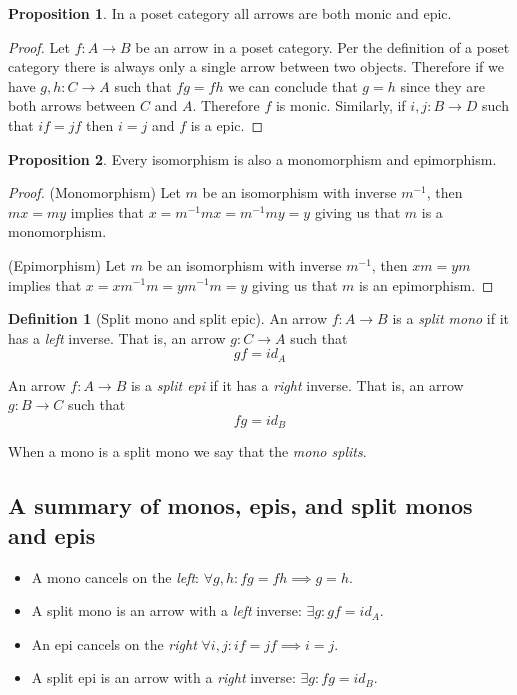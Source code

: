 \documentclass{book}
\theoremstyle{definition}
\newtheorem{definition}{Definition}[section]
\newtheorem{proposition}{Proposition}
\newcommand{\arr}[3]{#1 : #2 \rightarrow #3}
\newcommand\id{\mathit{id}}
\begin{document}
\begin{proposition}
  In a poset category all arrows are both monic and epic.
\end{proposition}
\begin{proof}
  Let $\arr{f}{A}{B}$ be an arrow in a poset category. Per the definition of a
  poset category there is always only a single arrow between two objects.
  Therefore if we have $\arr{g, h}{C}{A}$ such that $fg = fh$ we can conclude
  that $g = h$ since they are both arrows between $C$ and $A$. Therefore $f$ is
  monic. Similarly, if $\arr{i, j}{B}{D}$ such that $if = jf$ then $i = j$ and
  $f$ is a epic.
\end{proof}

\begin{proposition}
  Every isomorphism is also a monomorphism and epimorphism.
\end{proposition}
\begin{proof}
  (Monomorphism) Let $m$ be an isomorphism with inverse $m^{-1}$, then $mx = my$
  implies that $x = m^{-1}mx = m^{-1}my = y$ giving us that $m$ is a
  monomorphism.

  (Epimorphism) Let $m$ be an isomorphism with inverse $m^{-1}$, then $xm = ym$
  implies that $x = xm^{-1}m = ym^{-1}m = y$ giving us that $m$ is an
  epimorphism.
\end{proof}

\begin{definition}[Split mono and split epic]
  An arrow $\arr{f}{A}{B}$ is a \emph{split mono} if it has a \emph{left}
  inverse. That is, an arrow $\arr{g}{C}{A}$ such that
  \[ gf = \id_A \]

  An arrow $\arr{f}{A}{B}$ is a \emph{split epi} if it has a \emph{right}
  inverse. That is, an arrow $\arr{g}{B}{C}$ such that
  \[ fg = \id_B \]
\end{definition}

When a mono is a split mono we say that the \emph{mono splits}.

\subsection{A summary of monos, epis, and split monos and epis}

\begin{itemize}
\item A mono cancels on the \emph{left}: $\forall g, h : fg = fh \implies g = h$.
\item A split mono is an arrow with a \emph{left} inverse: $\exists g : gf = \id_A$.
\item An epi cancels on the \emph{right} $\forall i, j : if = jf \implies i = j$.
\item A split epi is an arrow with a \emph{right} inverse: $\exists g : fg = \id_B$.
\end{itemize}
\end{document}
